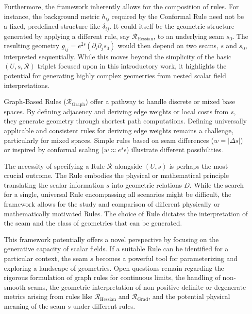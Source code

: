 \documentclass[twoside,twocolumn]{article}
\begin{document}
Furthermore, the framework inherently allows for the composition of rules. For instance, the background metric $h_{ij}$ required by the Conformal Rule need not be a fixed, predefined structure like $\delta_{ij}$. It could itself be the geometric structure generated by applying a different rule, say $\mathcal{R}_{\text{Hessian}}$, to an underlying seam $s_0$. The resulting geometry $g_{ij} = e^{2s} (\partial_i \partial_j s_0)$ would then depend on two seams, $s$ and $s_0$, interpreted sequentially. While this moves beyond the simplicity of the basic $(U, s, \mathcal{R})$ triplet focused upon in this introductory work, it highlights the potential for generating highly complex geometries from nested scalar field interpretations.

Graph-Based Rules ($\mathcal{R}_{\text{Graph}}$) offer a pathway to handle discrete or mixed base spaces. By defining adjacency and deriving edge weights or local costs from $s$, they generate geometry through shortest path computations. Defining universally applicable and consistent rules for deriving edge weights remains a challenge, particularly for mixed spaces. Simple rules based on seam differences ($w=|\Delta s|$) or inspired by conformal scaling ($w \approx e^s \epsilon$) illustrate different possibilities.

The necessity of specifying a Rule $\mathcal{R}$ alongside $(U, s)$ is perhaps the most crucial outcome. The Rule embodies the physical or mathematical principle translating the scalar information $s$ into geometric relations $D$. While the search for a single, universal Rule encompassing all scenarios might be difficult, the framework allows for the study and comparison of different physically or mathematically motivated Rules. The choice of Rule dictates the interpretation of the seam and the class of geometries that can be generated.

This framework potentially offers a novel perspective by focusing on the generative capacity of scalar fields. If a suitable Rule can be identified for a particular context, the seam $s$ becomes a powerful tool for parameterizing and exploring a landscape of geometries. Open questions remain regarding the rigorous formulation of graph rules for continuous limits, the handling of non-smooth seams, the geometric interpretation of non-positive definite or degenerate metrics arising from rules like $\mathcal{R}_{\text{Hessian}}$ and $\mathcal{R}_{\text{Grad}}$, and the potential physical meaning of the seam $s$ under different rules.
\end{document}
